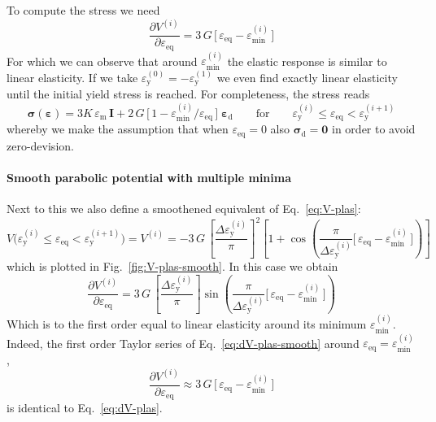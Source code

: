 \documentclass[times,namecite]{goose-article}
\begin{document}
To compute the stress we need
\begin{equation}\label{eq:dV-plas}
  \frac{\partial V^{(i)}}{\partial \varepsilon_\mathrm{eq}}
  =
  3 \, G \, \Big[\, \varepsilon_\mathrm{eq} - \varepsilon_\mathrm{min}^{(i)} \,\Big]
\end{equation}
For which we can observe that around $\varepsilon_\mathrm{min}^{(i)}$ the elastic response is similar to linear elasticity. If we take $\varepsilon_\mathrm{y}^{(0)} = - \varepsilon_\mathrm{y}^{(1)}$ we even find exactly linear elasticity until the initial yield stress is reached. For completeness, the stress reads
\begin{equation}
  \bm{\sigma} ( \bm{\varepsilon} )
  =
  3 K \, \varepsilon_\mathrm{m} \, \bm{I}
  +
  2 \, G \, \Big[\, 1 - \varepsilon_\mathrm{min}^{(i)} / \varepsilon_\mathrm{eq} \,\Big] \;
  \bm{\varepsilon}_\mathrm{d}
  \qquad
  \mathrm{for}
  \qquad
  \varepsilon_\mathrm{y}^{(i)} \leq \varepsilon_\mathrm{eq} < \varepsilon_\mathrm{y}^{(i+1)}
\end{equation}
whereby we make the assumption that when $\varepsilon_\mathrm{eq} = 0$ also $\bm{\sigma}_\mathrm{d} = \bm{0}$ in order to avoid zero-devision.

\paragraph{Smooth parabolic potential with multiple minima}

Next to this we also define a smoothened equivalent of Eq.~\eqref{eq:V-plas}:
\begin{equation}\label{eq:V-plas-smooth}
  V \big(
    \varepsilon_\mathrm{y}^{(i)} \leq \varepsilon_\mathrm{eq} < \varepsilon_\mathrm{y}^{(i+1)}
  \big)
  =
  V^{(i)}
  =
  - 3 \, G \,
  \left[ \frac{\Delta \varepsilon_\mathrm{y}^{(i)}}{\pi} \right]^2
  \left[
    1
    +
    \cos \left(
      \frac{ \pi }{ \Delta \varepsilon_\mathrm{y}^{(i)} }
      \Big[\, \varepsilon_\mathrm{eq} - \varepsilon_\mathrm{min}^{(i)} \,\Big]
    \right)
  \right]
\end{equation}
which is plotted in Fig.~\ref{fig:V-plas-smooth}. In this case we obtain
\begin{equation}\label{eq:dV-plas-smooth}
  \frac{\partial V^{(i)}}{\partial \varepsilon_\mathrm{eq}}
  =
  3 \, G \,
  \left[ \frac{\Delta \varepsilon_\mathrm{y}^{(i)}}{\pi} \right]
  \sin \left(
    \frac{ \pi }{ \Delta \varepsilon_\mathrm{y}^{(i)} }
    \Big[\, \varepsilon_\mathrm{eq} - \varepsilon_\mathrm{min}^{(i)} \,\Big]
  \right)
\end{equation}
Which is to the first order equal to linear elasticity around its minimum $\varepsilon_\mathrm{min}^{(i)}$. Indeed, the first order Taylor series of Eq.~\eqref{eq:dV-plas-smooth} around $\varepsilon_\mathrm{eq} = \varepsilon_\mathrm{min}^{(i)}$,
\begin{equation}
  \frac{\partial V^{(i)}}{\partial \varepsilon_\mathrm{eq}}
  \approx
  3 \, G \, \Big[\, \varepsilon_\mathrm{eq} - \varepsilon_\mathrm{min}^{(i)} \,\Big]
\end{equation}
is identical to Eq.~\eqref{eq:dV-plas}.
\end{document}
